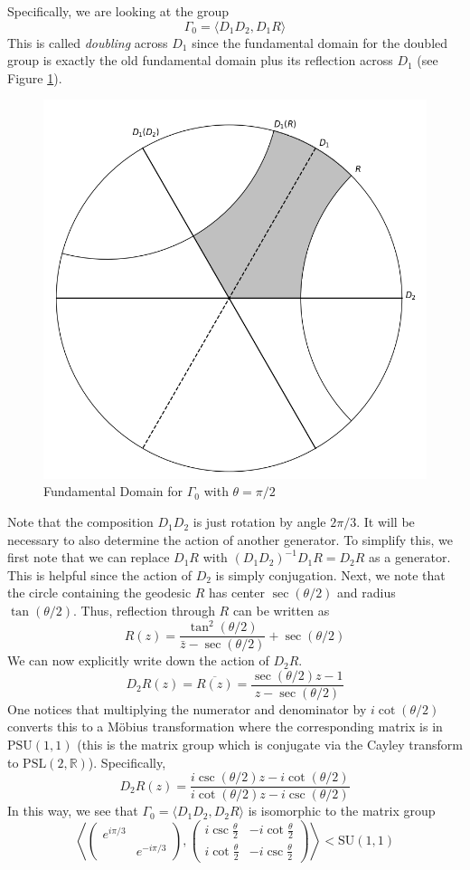 \documentclass[]{article}
\begin{document}
Specifically, we are looking at the group
$$
\Gamma_0 = \langle D_1D_2, D_1R \rangle
$$
This is called \textit{doubling} across $D_1$ since the fundamental domain for the doubled group is exactly the old fundamental domain plus its reflection across $D_1$ (see Figure \ref{fd_reflection_doubled}).
\begin{figure}
	\centering
	\includegraphics[width=0.5\linewidth]{reflection_doubled.png}
	\caption{Fundamental Domain for $\Gamma_0$ with $\theta = \pi/2$}
	\label{fd_reflection_doubled}
\end{figure}
Note that the composition $D_1D_2$ is just rotation by angle $2\pi/3$.
It will be necessary to also determine the action of another generator.
To simplify this, we first note that we can replace $D_1R$ with $(D_1D_2)^{-1}D_1R = D_2R$ as a generator.
This is helpful since the action of $D_2$ is simply conjugation.
Next, we note that the circle containing the geodesic $R$ has center $\sec(\theta/2)$ and radius $\tan(\theta/2)$.
Thus, reflection through $R$ can be written as
$$
R(z) = \frac{\tan^2(\theta/2)}{\bar{z} - \sec(\theta/2)} + \sec(\theta/2)
$$
We can now explicitly write down the action of $D_2R$.
$$
D_2R(z) = \overline{R(z)} =
\frac{\sec(\theta/2)z - 1}{z - \sec(\theta/2)}
$$
One notices that multiplying the numerator and denominator by $i\cot(\theta/2)$ converts this to a M\"obius transformation where the corresponding matrix is in $\text{PSU}(1, 1)$ (this is the matrix group which is conjugate via the Cayley transform to $\text{PSL}(2, \mathbb{R})$).
Specifically,
$$
D_2R(z) = \frac{i\csc(\theta/2)z - i\cot(\theta/2)}{i\cot(\theta/2)z - i\csc(\theta/2)}
$$
In this way, we see that $\Gamma_0 = \langle D_1D_2, D_2R \rangle$ is isomorphic to the matrix group
$$
\left\langle
\begin{pmatrix}
e^{i\pi/3} & ~ \\
~ & e^{-i\pi/3}
\end{pmatrix},
\begin{pmatrix}
i\csc\frac{\theta}{2} & -i\cot\frac{\theta}{2} \\
i\cot\frac{\theta}{2} & -i\csc\frac{\theta}{2}
\end{pmatrix}
\right\rangle < \text{SU}(1, 1)
$$
\end{document}
